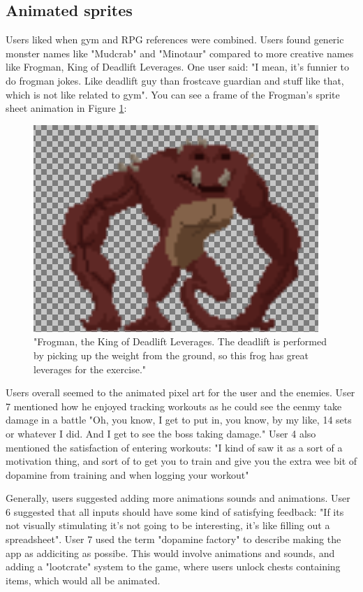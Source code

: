 \documentclass{l4proj}
\begin{document}
\subsection{Animated sprites}
Users liked when gym and RPG references were combined. Users found generic monster names like "Mudcrab" and "Minotaur" compared to more creative names like Frogman, King of Deadlift Leverages. One user said: "I mean, it's funnier to do frogman jokes. Like deadlift guy than frostcave guardian and stuff like that, which is not like related to gym". You can see a frame of the Frogman's sprite sheet animation in Figure \ref{fig:frogman}:


\begin{figure}[H]
    \centering
    \includegraphics[width=1.0\linewidth]{froggie.png}    
    \caption{
      "Frogman, the King of Deadlift Leverages. The deadlift is performed by picking up the weight from the ground, so this frog has great leverages for the exercise."
    }
    \label{fig:frogman} 
\end{figure}

Users overall seemed to the animated pixel art for the user and the enemies. User 7 mentioned how he enjoyed tracking workouts as he could see the eenmy take damage in a battle "Oh, you know, I get to put in, you know, by my like, 14 sets or whatever I did. And I get to see the boss taking damage." User 4 also mentioned the satisfaction of entering workouts: "I kind of saw it as a sort of a motivation thing, and sort of to get you to train and give you the extra wee bit of dopamine from training and when logging your workout"

Generally, users suggested adding more animations sounds and animations.  User 6 suggested that all inputs should have some kind of satisfying feedback: "If its not visually stimulating it's not going to be interesting, it's like filling out a spreadsheet". User 7 used the term "dopamine factory" to  describe making the app as addiciting as possibe. This would involve animations and sounds, and adding a "lootcrate" system to the game, where users unlock chests containing items, which would all be animated. 
\end{document}
